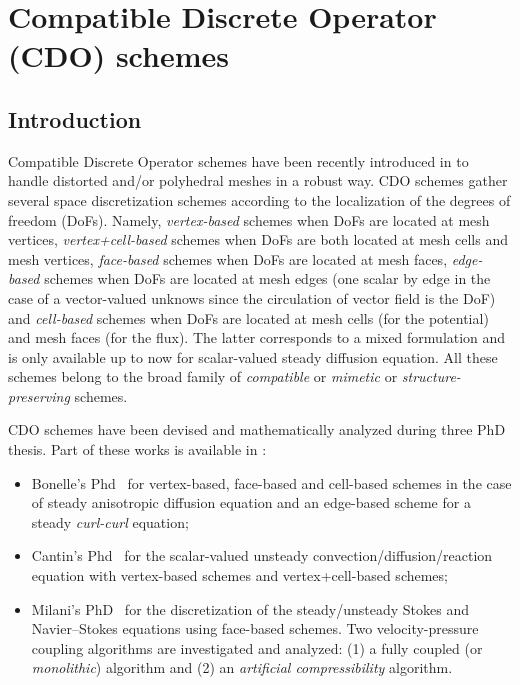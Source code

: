 \section{Compatible Discrete Operator (CDO) schemes}

\subsection{Introduction }

Compatible Discrete Operator schemes have been recently introduced in \CS to
handle distorted and/or polyhedral meshes in a robust way. CDO schemes gather
several space discretization schemes according to the localization of the
degrees of freedom (DoFs). Namely, \emph{vertex-based} schemes when DoFs are
located at mesh vertices, \emph{vertex+cell-based} schemes when DoFs are both
located at mesh cells and mesh vertices, \emph{face-based} schemes when DoFs
are located at mesh faces, \emph{edge-based} schemes when DoFs are located at
mesh edges (one scalar by edge in the case of a vector-valued unknows since the
circulation of vector field is the DoF) and \emph{cell-based} schemes when DoFs
are located at mesh cells (for the potential) and mesh faces (for the
flux). The latter corresponds to a mixed formulation and is only available up
to now for scalar-valued steady diffusion equation.  All these schemes belong
to the broad family of \emph{compatible} or \emph{mimetic} or
\emph{structure-preserving} schemes.

CDO schemes have been devised and mathematically analyzed during three PhD
thesis. Part of these works is available in \CS:
\begin{itemize}
\item Bonelle's Phd~\cite{Bonel14} for vertex-based, face-based and cell-based
  schemes in the case of steady anisotropic diffusion equation and an
  edge-based scheme for a steady \emph{curl-curl} equation;
\item Cantin's Phd~\cite{Cant16} for the scalar-valued unsteady
  convection/diffusion/reaction equation with vertex-based schemes and
  vertex+cell-based schemes;
\item Milani's PhD~\cite{Mila20} for the discretization of the steady/unsteady
  Stokes and Navier--Stokes equations using face-based schemes. Two
  velocity-pressure coupling algorithms are investigated and analyzed: (1) a
  fully coupled (or \textit{monolithic}) algorithm and (2) an
  \textit{artificial compressibility} algorithm.
\end{itemize}

